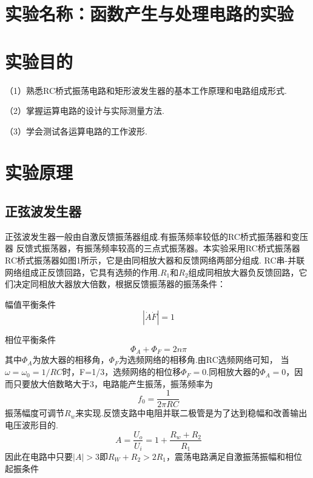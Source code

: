 \documentclass{article}
\begin{document}
	\section{ 实验名称：函数产生与处理电路的实验}
    \section{ 实验目的}
     （1）熟悉RC桥式振荡电路和矩形波发生器的基本工作原理和电路组成形式.\par
               （2）掌握运算电路的设计与实际测量方法.\par
               （3）学会测试各运算电路的工作波形. \par
             
			   \section{ 实验原理}
               \subsection{正弦波发生器}
               正弦波发生器一般由自激反馈振荡器组成.有振荡频率较低的RC桥式振荡器和变压器
               反馈式振荡器，有振荡频率较高的三点式振荡器。本实验采用RC桥式振荡器           
            RC桥式振荡器如图1所示，它是由同相放大器和反馈网络两部分组成.
            RC串-并联网络组成正反馈回路，它具有选频的作用.$R_1$和$R_2$组成同相放大器负反馈回路，它们决定同相放大器放大倍数，根据反馈振荡器的振荡条件：

            \par
            幅值平衡条件
            \begin{equation*}
               \ |\dot{A}\dot{F}|=1
               \end{equation*}
               \par
               相位平衡条件
               \begin{equation*}
                \ \Phi_A+\Phi_F=2n\pi 
                \end{equation*}
                其中$\Phi_A$为放大器的相移角，$\Phi_F$为选频网络的相移角.由RC选频网络可知，
                当$\omega =\omega_0=1/RC$时，F=1/3，选频网络的相位移$\Phi_F=0$.同相放大器的$\Phi_A=0$，因而只要放大倍数略大于3，电路能产生振荡，振荡频率为
                \begin{equation*}
                    \ f_0=\frac{1}{2\pi RC}
                    \end{equation*}
                振荡幅度可调节$R_w$来实现.反馈支路中电阻并联二极管是为了达到稳幅和改善输出电压波形目的.
                \begin{equation*}
                    \ A=\frac{U_o}{U_i}=1+\frac{R_w+R_2}{R_1}
                \end{equation*}
                因此在电路中只要$|A|>3$即$R_W+R_2>2R_1$，震荡电路满足自激振荡振幅和相位起振条件
\end{document}
